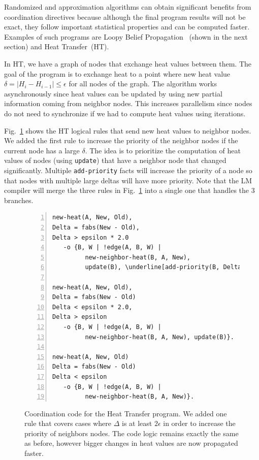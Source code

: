 Randomized and approximation
algorithms can obtain significant benefits from coordination directives because although the final
program results will not be exact, they follow important statistical properties and can be computed faster.
Examples of such programs are Loopy Belief
Propagation~\cite{Gonzalez+al:aistats09paraml} (shown in the next section) and
Heat Transfer~(HT).

In HT, we have a graph of nodes that exchange heat values between them. The goal
of the program is to exchange heat to a point where new heat value $\delta = |H_i -
H_{i-1}| \le \epsilon$ for all nodes of the graph. The algorithm works
asynchronously since heat values can be updated by using new partial information
coming from neighbor nodes. This increases parallelism since nodes do not need
to synchronize if we had to compute heat values using iterations.

Fig.~\ref{code:ht} shows the HT logical rules that send new heat values to
neighbor nodes. We added the first rule to increase the priority of the neighbor
nodes if the current node has a large $\delta$. The idea is to prioritize the
computation of heat values of nodes (using \texttt{update}) that have a neighbor
node that changed significantly. Multiple \texttt{add-priority} facts will
increase the priority of a node so that nodes with multiple large deltas will
have more priority. Note that the LM compiler will merge the three rules in
Fig.~\ref{code:ht} into a single one that handles the 3 branches.

\begin{figure}[h!]
\scriptsize\begin{Verbatim}[numbers=left,commandchars=\\\[\]]
new-heat(A, New, Old),
Delta = fabs(New - Old),
Delta > epsilon * 2.0
   -o {B, W | !edge(A, B, W) |
         new-neighbor-heat(B, A, New),
         update(B), \underline[add-priority(B, Delta)]}.

new-heat(A, New, Old),
Delta = fabs(New - Old)
Delta < epsilon * 2.0,
Delta > epsilon
   -o {B, W | !edge(A, B, W) |
         new-neighbor-heat(B, A, New), update(B)}.

new-heat(A, New, Old)
Delta = fabs(New - Old)
Delta < epsilon
   -o {B, W | !edge(A, B, W) |
         new-neighbor-heat(B, A, New)}.
\end{Verbatim}
  \caption{Coordination code for the Heat Transfer program. We added one rule
     that covers cases where $\Delta$ is at least $2 \epsilon$ in order to
     increase the priority of neighbors nodes. The code logic remains exactly
     the same as before, however bigger changes in heat values are now
     propagated faster.}
  \label{code:ht}
\end{figure}
\normalsize

